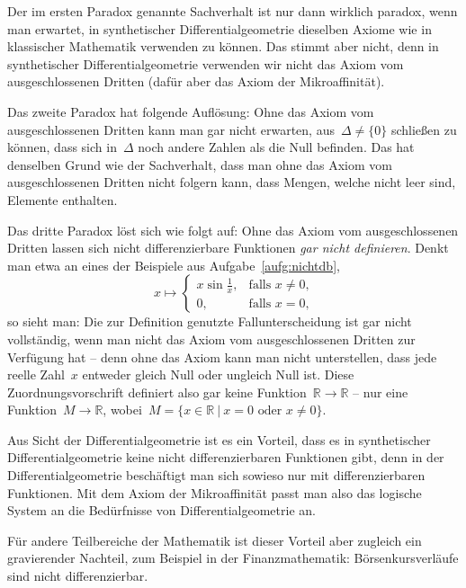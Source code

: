 \documentclass[twoside]{../zirkelblatt}
\newcommand{\RR}{\mathbb{R}}
\theoremstyle{definition}
\theoremstyle{plain}
\theoremstyle{remark}
\begin{document}
Der im ersten Paradox genannte Sachverhalt ist nur dann wirklich paradox, wenn
man erwartet, in synthetischer Differentialgeometrie dieselben Axiome wie in
klassischer Mathematik verwenden zu können. Das stimmt aber nicht, denn in
synthetischer Differentialgeometrie verwenden wir nicht das Axiom vom
ausgeschlossenen Dritten (dafür aber das Axiom der Mikroaffinität).

Das zweite Paradox hat folgende Auflösung: Ohne das Axiom vom ausgeschlossenen
Dritten kann man gar nicht erwarten, aus~$\Delta \neq \{0\}$ schließen zu
können, dass sich in~$\Delta$ noch andere Zahlen als die Null befinden.
Das hat denselben Grund wie der Sachverhalt, dass man ohne das Axiom vom
ausgeschlossenen Dritten nicht folgern kann, dass Mengen, welche nicht leer
sind, Elemente enthalten.

Das dritte Paradox löst sich wie folgt auf: Ohne das Axiom vom ausgeschlossenen
Dritten lassen sich nicht differenzierbare Funktionen \emph{gar nicht definieren}.
Denkt man etwa an eines der Beispiele aus Aufgabe~\ref{aufg:nichtdb},
\[ x \longmapsto \begin{cases}x \sin\frac{1}{x}, & \text{falls $x \neq 0$,} \\
0, & \text{falls $x = 0$,}\end{cases} \]
so sieht man: Die zur Definition genutzte Fallunterscheidung ist gar nicht
vollständig, wenn man nicht das Axiom vom ausgeschlossenen Dritten zur
Verfügung hat -- denn ohne das Axiom kann man nicht unterstellen, dass jede reelle
Zahl~$x$ entweder gleich Null oder ungleich Null ist. Diese
Zuordnungsvorschrift definiert also gar keine Funktion~$\RR \to \RR$ -- nur
eine Funktion~$M \to \RR$, wobei~$M = \{ x \in \RR \ |\ \text{$x = 0$ oder $x \neq 0$} \}$.

Aus Sicht der Differentialgeometrie ist es ein Vorteil, dass es in
synthetischer Differentialgeometrie keine nicht differenzierbaren Funktionen
gibt, denn in der Differentialgeometrie beschäftigt man sich sowieso nur mit
differenzierbaren Funktionen. Mit dem Axiom der Mikroaffinität passt man also
das logische System an die Bedürfnisse von Differentialgeometrie an.

Für andere Teilbereiche der Mathematik ist dieser Vorteil aber zugleich ein
gravierender Nachteil, zum Beispiel in der Finanzmathematik: Börsenkursverläufe
sind nicht differenzierbar.
\end{document}
